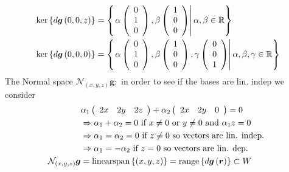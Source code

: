 \documentclass[aps,preprint]{revtex4}%
\begin{document}
\begin{align*}
\ker\left\{  d\boldsymbol{g}\left(  0,0,z\right)  \right\}   &  =\left\{
\left.  \alpha\left(
\begin{array}
[c]{c}%
0\\
1\\
0
\end{array}
\right)  ,\beta\left(
\begin{array}
[c]{c}%
1\\
0\\
0
\end{array}
\right)  \right\vert \alpha,\beta\in\mathbb{R}\right\} \\
\ker\left\{  d\boldsymbol{g}\left(  0,0,0\right)  \right\}   &  =\left\{
\left.  \alpha\left(
\begin{array}
[c]{c}%
0\\
1\\
0
\end{array}
\right)  ,\beta\left(
\begin{array}
[c]{c}%
1\\
0\\
0
\end{array}
\right)  ,\gamma\left(
\begin{array}
[c]{c}%
0\\
0\\
1
\end{array}
\right)  \right\vert \alpha,\beta,\gamma\in\mathbb{R}\right\}
\end{align*}
The Normal space $\mathcal{N}_{\left(  x,y,z\right)  }\boldsymbol{g:}$ in
order to see if the bases are lin. indep we consider%
\begin{align*}
&  \alpha_{1}\left(
\begin{array}
[c]{ccc}%
2x & 2y & 2z
\end{array}
\right)  +\alpha_{2}\left(
\begin{array}
[c]{ccc}%
2x & 2y & 0
\end{array}
\right)  =0\\
&  \Rightarrow\alpha_{1}+\alpha_{2}=0\text{ if }x\neq0\text{ or }y\neq0\text{
and }\alpha_{1}z=0\\
&  \Rightarrow\alpha_{1}=\alpha_{2}=0\text{ if }z\neq0\text{ so vectors are
lin. indep. }\\
&  \Rightarrow\alpha_{1}=-\alpha_{2}\text{ if }z=0\text{ so vectors are lin.
dep.}\\
\mathcal{N}_{\left(  x,y,z\right)  }\boldsymbol{g}  &
=\operatorname*{linearspan}\left\{  \left(  x,y,z\right)  \right\}
=\operatorname*{range}\left\{  d\boldsymbol{g}\left(  \boldsymbol{r}\right)
\right\}  \subset W
\end{align*}%
\end{document}
